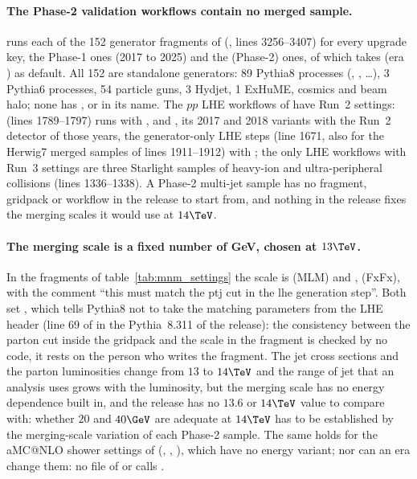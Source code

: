 \paragraph{The Phase-2 validation workflows contain no merged sample.}
 runs each of the 152 generator fragments of 
(, lines 3256--3407) for every upgrade
key, the Phase-1 ones (2017 to 2025) and the  (Phase-2) ones, of which  takes
 (era ) as default. All 152 are standalone generators: 89 Pythia8 processes
(, , \dots), 3 Pythia6 processes, 54 particle
guns, 3 Hydjet, 1 ExHuME, cosmics and beam halo; none has ,  or  in its name. The $pp$
LHE workflows of  have Run~2 settings:  (lines 1789--1797) runs with
,  and , its
2017 and 2018 variants with the Run~2 detector of those years, the generator-only LHE steps (line 1671, also for the
Herwig7 merged samples of lines 1911--1912) with ; the only LHE workflows with Run~3 settings are
three Starlight samples of heavy-ion and ultra-peripheral collisions (lines 1336--1338). A Phase-2 multi-jet sample
has no fragment, gridpack or workflow in the release to start from, and nothing in the release fixes the merging
scales it would use at $14\TeV$.

\paragraph{The merging scale is a fixed number of GeV, chosen at $13\TeV$.}
In the fragments of table~\ref{tab:mnm_settings} the scale is  (MLM) and
,  (FxFx), with the comment ``this must match the ptj cut
in the lhe generation step''. Both set , which tells Pythia8 not to take the matching
parameters from the LHE header (line 69 of  in the Pythia~8.311 of the release): the consistency
between the parton cut inside the gridpack and the scale in the fragment is checked by no code, it rests on the person
who writes the fragment. The jet cross sections and the parton luminosities change from $13$ to $14\TeV$ and the range
of jet \pt{} that an analysis uses grows with the luminosity, but the merging scale has no energy dependence built in,
and the release has no $13.6$ or $14\TeV$ value to compare with: whether $20$ and $40\GeV$ are adequate at $14\TeV$
has to be established by the merging-scale variation of each Phase-2 sample. The same holds for the aMC@NLO shower
settings of  (,
, ), which have no energy variant; nor can an
era change them: no file of  or  calls
.

